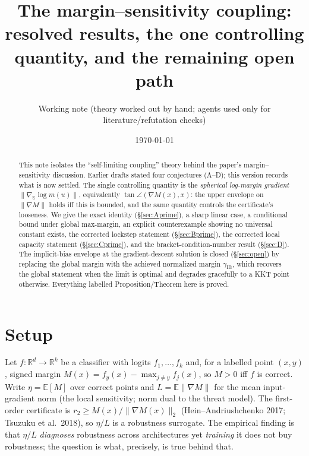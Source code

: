 \documentclass[11pt]{article}
\title{The margin--sensitivity coupling:\\
resolved results, the one controlling quantity, and the remaining open path}
\author{Working note (theory worked out by hand; agents used only for literature/refutation checks)}
\date{\today}
\theoremstyle{definition}
\newcommand{\R}{\mathbb{R}}
\newcommand{\E}{\mathbb{E}}
\newcommand{\Sph}{\mathbb{S}}
\newcommand{\dd}{d}
\newcommand{\grad}{\nabla}
\begin{document}
\maketitle

\begin{abstract}
This note isolates the ``self-limiting coupling'' theory behind the paper's
margin--sensitivity discussion. Earlier drafts stated four conjectures (A--D); this
version records what is now settled. The single controlling quantity is the
\emph{spherical log-margin gradient} $\|\grad_{\Sph}\log m(u)\|$, equivalently
$\tan\angle(\grad M(x),x)$: the upper envelope on $\|\grad M\|$ holds iff this is
bounded, and the same quantity controls the certificate's looseness. We give the
exact identity (\S\ref{sec:Aprime}), a sharp linear case, a conditional bound under
global max-margin, an explicit counterexample showing no universal constant exists,
the corrected lockstep statement (\S\ref{sec:Bprime}), the corrected local capacity
statement (\S\ref{sec:Cprime}), and the bracket-condition-number result
(\S\ref{sec:D}). The implicit-bias envelope at the gradient-descent solution is
closed (\S\ref{sec:open}) by replacing the global margin with the achieved normalized
margin $\gamma_{\mathrm{IB}}$, which recovers the global statement when the limit is
optimal and degrades gracefully to a KKT point otherwise. Everything labelled
Proposition/Theorem here is proved.
\end{abstract}

\section{Setup}\label{sec:setup}
Let $f:\R^{\dd}\to\R^{k}$ be a classifier with logits $f_1,\dots,f_k$ and, for a
labelled point $(x,y)$, signed margin $M(x)=f_y(x)-\max_{j\neq y}f_j(x)$, so $M>0$
iff $f$ is correct. Write $\eta=\E[M]$ over correct points and $L=\E\|\grad M\|$ for
the mean input-gradient norm (the local sensitivity; norm dual to the threat model).
The first-order certificate is $r_2\ge M(x)/\|\grad M(x)\|_2$
(Hein--Andriushchenko 2017; Tsuzuku et al.\ 2018), so $\eta/L$ is a robustness
surrogate. The empirical finding is that $\eta/L$ \emph{diagnoses} robustness across
architectures yet \emph{training} it does not buy robustness; the question is what,
precisely, is true behind that.
\end{document}
